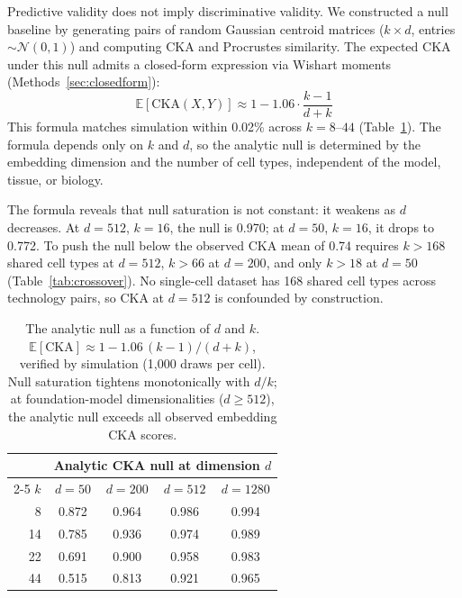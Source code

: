 \documentclass[11pt]{article}
\begin{document}
Predictive validity does not imply discriminative validity. We
constructed a null baseline by generating pairs of random Gaussian
centroid matrices ($k \times d$, entries $\sim \mathcal{N}(0,1)$) and
computing CKA and Procrustes similarity. The expected CKA under this
null admits a closed-form expression via Wishart moments
(Methods~\ref{sec:closedform}):
\begin{equation}
\label{eq:cka_null}
\mathbb{E}[\mathrm{CKA}(X, Y)] \approx 1 - 1.06 \cdot \frac{k-1}{d+k}
\end{equation}
This formula matches simulation within 0.02\% across $k = 8$--$44$
(Table~\ref{tab:nullfloor}). The formula depends only on $k$ and $d$,
so the analytic null is determined by the embedding dimension and the
number of cell types, independent of the model, tissue, or biology.

The formula reveals that null saturation is not constant: it weakens
as $d$ decreases. At $d = 512$, $k = 16$, the null is 0.970; at
$d = 50$, $k = 16$, it drops to 0.772. To push the null below the
observed CKA mean of 0.74 requires $k > 168$ shared cell types at
$d = 512$, $k > 66$ at $d = 200$, and only $k > 18$ at $d = 50$
(Table~\ref{tab:crossover}). No single-cell dataset has 168 shared cell
types across technology pairs, so CKA at $d = 512$ is confounded by
construction.

\begin{table}[t]
\centering
\caption{The analytic null as a function of $d$ and $k$.
$\mathbb{E}[\mathrm{CKA}] \approx 1 - 1.06\,(k{-}1)/(d{+}k)$,
verified by simulation (1,000 draws per cell). Null saturation tightens
monotonically with $d/k$; at foundation-model dimensionalities
($d \geq 512$), the analytic null exceeds all observed embedding CKA scores.}
\label{tab:nullfloor}
\small
\begin{tabular}{@{}rcccc@{}}
\toprule
& \multicolumn{4}{c}{Analytic CKA null at dimension $d$} \\
\cmidrule(lr){2-5}
$k$ & $d = 50$ & $d = 200$ & $d = 512$ & $d = 1280$ \\
\midrule
8  & 0.872 & 0.964 & 0.986 & 0.994 \\
14 & 0.785 & 0.936 & 0.974 & 0.989 \\
22 & 0.691 & 0.900 & 0.958 & 0.983 \\
44 & 0.515 & 0.813 & 0.921 & 0.965 \\
\bottomrule
\end{tabular}
\end{table}
\end{document}
